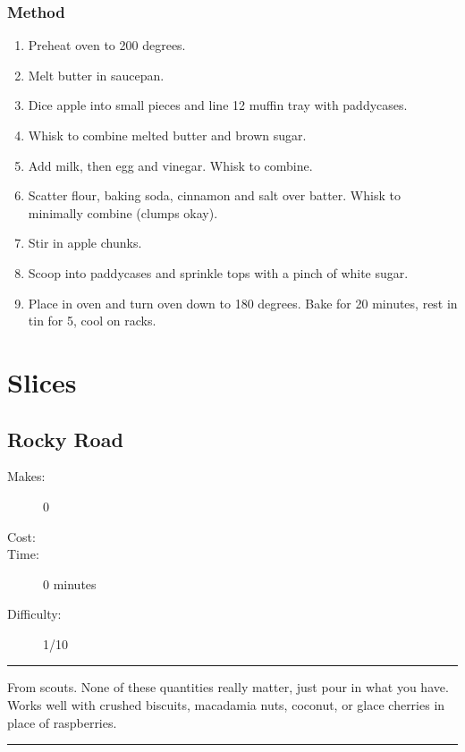 \documentclass[]{article}
\begin{document}
\subsubsection*{\Large Method}
\begin{enumerate}[font=\huge\color{accent}]
	\item Preheat oven to 200 degrees.
	\item Melt butter in saucepan.
	\item Dice apple into small pieces and line 12 muffin tray with paddycases.
	\item Whisk to combine melted butter and brown sugar.
	\item Add milk, then egg and vinegar. Whisk to combine.
	\item Scatter flour, baking soda, cinnamon and salt over batter. Whisk to minimally combine (clumps okay).
	\item Stir in apple chunks.
	\item Scoop into paddycases and sprinkle tops with a pinch of white sugar.
	\item Place in oven and turn oven down to 180 degrees. Bake for 20 minutes, rest in tin for 5, cool on racks.
\end{enumerate}
\newpage
{}
\section*{\center\Huge\color{accent}Slices}
\label{cat:Slices}
\label{rec:Rocky Road}
\subsection*{\center\huge Rocky Road}
\begin{description}
\item[Makes:] 0 
\item[Cost:] \textdollar
\item[Time:] 0 minutes
\item[Difficulty:] 1/10
\end{description}
\vspace{0.2cm}\hrule\vspace{0.5cm}
\begin{adjustwidth}{0.5 cm}{0.5 cm}

From scouts. None of these quantities really matter, just pour in what you have. Works well with crushed biscuits, macadamia nuts, coconut, or glace cherries in place of raspberries. \hfill\color{accent}{\Large\faVimeoSquare\hspace{0.1cm}\faGlide\hspace{0.1cm}\faTruck\hspace{0.1cm}}\color{black}

\end{adjustwidth}
\vspace{0.5cm}\hrule
\end{document}
